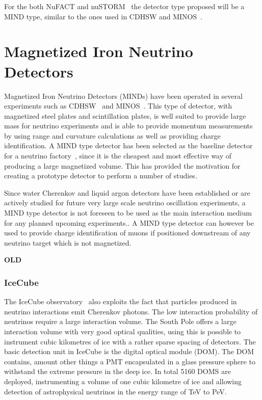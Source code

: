 For the both NuFACT and nuSTORM~\cite{77nustorm} the detector type proposed will be a MIND type, similar to the ones used in CDHSW and MINOS~\cite{NuFACTIDS}.

\pagebreak
\section{Magnetized Iron Neutrino Detectors}\label{subsec:MINDdetector}

Magnetized Iron Neutrino Detectors (MINDs) have been operated in several experiments such as CDHSW~\cite{40CDHSW} and MINOS~\cite{MINOS}. This type of detector, with magnetized steel plates and scintillation plates, is well suited to provide large mass for neutrino experiments and is able to provide momentum measurements by using range and curvature calculations as well as providing charge identification. A MIND type detector has been selected as the baseline detector for a neutrino factory~\cite{ISS, 27Bross}, since it is the cheapest and most effective way of producing a large magnetized volume. This has provided the motivation for creating a prototype detector to perform a number of studies.

Since water Cherenkov and liquid argon detectors have been established or are actively studied for future very large scale neutrino oscillation experiments, a MIND type detector is not foreseen to be used as the main interaction medium for any planned upcoming experiments.. A MIND type detector can however be used to provide charge identification of muons if positioned downstream of any neutrino target which is not magnetized.

\textbf{OLD}

\subsubsection{IceCube}
The IceCube observatory~\cite{43IceCube} also exploits the fact that particles produced in neutrino interactions emit Cherenkov photons. The low interaction probability of neutrinos require a large interaction volume. The South Pole offers a large interaction volume with very good optical qualities, using this is possible to instrument cubic kilometres of ice with a rather sparse spacing of detectors. The basic detection unit in IceCube is the digital optical module (DOM). The DOM contains, amount other things a PMT encapsulated in a glass pressure sphere to withstand the extreme pressure in the deep ice. In total 5160 DOMS are deployed, instrumenting a volume of one cubic kilometre of ice and allowing detection of astrophysical neutrinos in the energy range of TeV to PeV.

